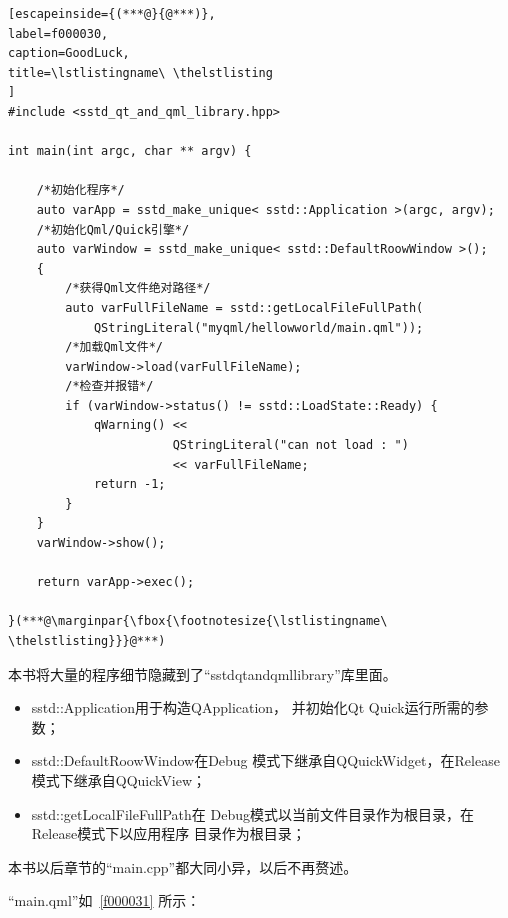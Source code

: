 \FloatBarrier
\begin{lstlisting}[escapeinside={(***@}{@***)},
label=f000030,
caption=GoodLuck,
title=\lstlistingname\ \thelstlisting
]
#include <sstd_qt_and_qml_library.hpp>

int main(int argc, char ** argv) {

    /*初始化程序*/
    auto varApp = sstd_make_unique< sstd::Application >(argc, argv);
    /*初始化Qml/Quick引擎*/
    auto varWindow = sstd_make_unique< sstd::DefaultRoowWindow >();
    {
        /*获得Qml文件绝对路径*/
        auto varFullFileName = sstd::getLocalFileFullPath(
            QStringLiteral("myqml/hellowworld/main.qml"));
        /*加载Qml文件*/
        varWindow->load(varFullFileName);
        /*检查并报错*/
        if (varWindow->status() != sstd::LoadState::Ready) {
            qWarning() <<
                       QStringLiteral("can not load : ")
                       << varFullFileName;
            return -1;
        }
    }
    varWindow->show();

    return varApp->exec();

}(***@\marginpar{\fbox{\footnotesize{\lstlistingname\ \thelstlisting}}}@***)\end{lstlisting}          %

本书将大量的程序细节隐藏到了“sstd\underline{\hspace{0.5em}}qt\underline{\hspace{0.5em}}and\underline{\hspace{0.5em}}qml\underline{\hspace{0.5em}}library”库里面。

\begin{itemize}
\item sstd::Application用于构造QApplication，
并初始化Qt Quick运行所需的参数；
\item sstd::DefaultRoowWindow在Debug
模式下继承自QQuickWidget，在Release模式下继承自QQuickView；
\item sstd::getLocalFileFullPath在
Debug模式以当前文件目录作为根目录，在Release模式下以应用程序
目录作为根目录；
\end{itemize}

本书以后章节的“main.cpp”都大同小异，以后不再赘述。


“main.qml”如\lstlistingname\ \ref{f000031}
所示：

